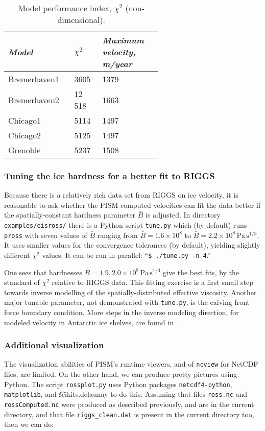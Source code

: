 \small
\begin{table}[ht]
\centering
\caption{Model performance index, $\chi^2$ (non-dimensional).  }\label{tab:chisqr}
\begin{tabular}{p{0.2\linewidth}p{0.1\linewidth}p{0.3\linewidth}}\toprule
\textsl{Model} & $\chi^2$ & \textsl{Maximum velocity, m/year} \\\midrule
Bremerhaven1 & 3605 & 1379 \\
Bremerhaven2 & 12\,518 & 1663 \\
Chicago1 & 5114 & 1497 \\
Chicago2 & 5125 & 1497 \\
Grenoble & 5237 & 1508 \\
\bottomrule
\end{tabular}
\end{table}
\normalsize

\subsubsection*{Tuning the ice hardness for a better fit to RIGGS}  Because there is a relatively rich data set from RIGGS on ice velocity, it is reasonable to ask whether the PISM computed velocities can fit the data better if the spatially-constant hardness parameter $\bar B$ is adjusted.  In directory \texttt{examples/eisross/} there is a Python script \texttt{tune.py} which (by default) runs \texttt{pross} with seven values of $\bar B$ ranging from $\bar B = 1.6  \times 10^8$ to $\bar B = 2.2 \times 10^8 \, \text{Pa}\, \text{s}^{1/3}$.  It uses smaller values for the convergence tolerances (by default), yielding slightly different $\chi^2$ values.  It can be run in parallel: ``\texttt{\$ ./tune.py -n 4}.''

One sees that hardnesses $\bar B = 1.9,2.0 \times 10^8 \, \text{Pa}\, \text{s}^{1/3}$ give the best fits, by the standard of $\chi^2$ relative to RIGGS data.  This fitting exercise is a first small step towards inverse modelling of the spatially-distributed effective viscosity.  Another major tunable parameter, not demonstrated with \texttt{tune.py}, is the calving front force boundary condition.  More steps in the inverse modeling direction, for modeled velocity in Antarctic ice shelves, are found in \cite{HumbertGreveHutter,RommelaereMacAyeal}.


\subsubsection*{Additional visualization}  The visualization abilities of PISM's runtime viewers, and of \texttt{ncview} for NetCDF files, are limited.  On the other hand, we can produce pretty pictures using Python.  The script \texttt{rossplot.py} uses Python packages \texttt{netcdf4-python}, \texttt{matplotlib}, and \t{scikits.delaunay} to do this.  Assuming that files \texttt{ross.nc} and \texttt{rossComputed.nc} were produced as described previously, and are in the current directory, and that file \texttt{riggs_clean.dat} is present in the current directory too, then we can do:

